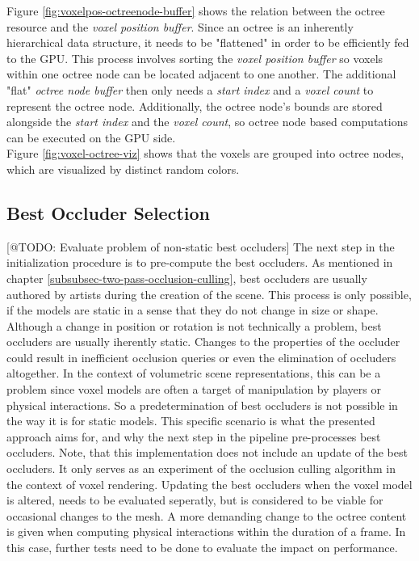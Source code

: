 \noindent
Figure \ref{fig:voxelpos-octreenode-buffer} shows the relation between the octree resource and the \emph{voxel position buffer}.
Since an octree is an inherently hierarchical data structure, it needs to be "flattened" in order to be efficiently fed 
to the \ac{GPU}. This process involves sorting the \emph{voxel position buffer} so voxels within one octree node can be 
located adjacent to one another. The additional "flat" \emph{octree node buffer} then only needs a \emph{start index} 
and a \emph{voxel count} to represent the octree node. Additionally, the octree node's bounds are stored alongside the 
\emph{start index} and the \emph{voxel count}, so octree node based computations can be executed on the \ac{GPU} side. \\

\noindent
Figure \ref{fig:voxel-octree-viz} shows that the voxels are grouped into octree nodes, which are visualized by distinct 
random colors. 


\subsection*{Best Occluder Selection} \label{subsec-best-occluder-selection}

[@TODO: Evaluate problem of non-static best occluders]
The next step in the initialization procedure is to pre-compute the best occluders. As mentioned in chapter 
\ref{subsubsec-two-pass-occlusion-culling}, best occluders are usually authored by artists during the creation of 
the scene. This process is only possible, if the models are static in a sense that they do not change in size or 
shape. Although a change in position or rotation is not technically a problem, best occluders are usually iherently 
static. Changes to the properties of the occluder could result in inefficient occlusion queries or even the elimination 
of occluders altogether. In the context of volumetric scene representations, this can be a problem since voxel models 
are often a target of manipulation by players or physical interactions. So a predetermination of best occluders is not 
possible in the way it is for static models. This specific scenario is what the presented approach aims for, and why the 
next step in the pipeline pre-processes best occluders. Note, that this implementation does not include an update of 
the best occluders. It only serves as an experiment of the occlusion culling algorithm in the context of voxel rendering. 
Updating the best occluders when the voxel model is altered, needs to be evaluated seperatly, but is considered to be 
viable for occasional changes to the mesh. A more demanding change to the octree content is given when computing physical 
interactions within the duration of a frame. In this case, further tests need to be done to evaluate the impact on 
performance. \\


